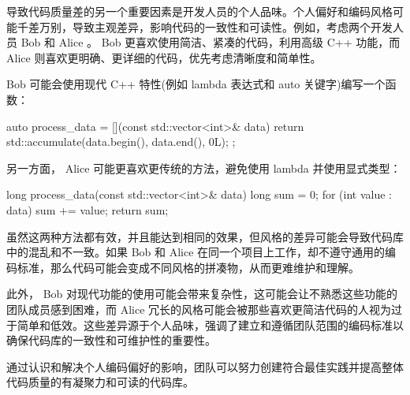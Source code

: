 导致代码质量差的另一个重要因素是开发人员的个人品味。个人偏好和编码风格可能千差万别，导致主观差异，影响代码的一致性和可读性。例如，考虑两个开发人员 Bob 和 Alice 。 Bob 更喜欢使用简洁、紧凑的代码，利用高级 C++ 功能，而 Alice 则喜欢更明确、更详细的代码，优先考虑清晰度和简单性。

Bob 可能会使用现代 C++ 特性(例如 lambda 表达式和 auto 关键字)编写一个函数：

\begin{cpp}
auto process_data = [](const std::vector<int>& data) {
    return std::accumulate(data.begin(), data.end(), 0L);
};
\end{cpp}

另一方面， Alice 可能更喜欢更传统的方法，避免使用 lambda 并使用显式类型：

\begin{cpp}
long process_data(const std::vector<int>& data) {
    long sum = 0;
    for (int value : data) {
        sum += value;
    }
    return sum;
}
\end{cpp}

虽然这两种方法都有效，并且能达到相同的效果，但风格的差异可能会导致代码库中的混乱和不一致。如果 Bob 和 Alice 在同一个项目上工作，却不遵守通用的编码标准，那么代码可能会变成不同风格的拼凑物，从而更难维护和理解。

此外， Bob 对现代功能的使用可能会带来复杂性，这可能会让不熟悉这些功能的团队成员感到困难，而 Alice 冗长的风格可能会被那些喜欢更简洁代码的人视为过于简单和低效。这些差异源于个人品味，强调了建立和遵循团队范围的编码标准以确保代码库的一致性和可维护性的重要性。

通过认识和解决个人编码偏好的影响，团队可以努力创建符合最佳实践并提高整体代码质量的有凝聚力和可读的代码库。
